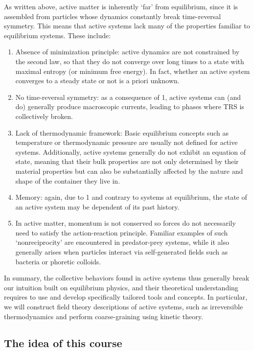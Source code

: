 As written above, active matter is inherently `far' from equilibrium, since it is assembled from particles whose dynamics constantly break time-reversal symmetry. This means that active systems lack many of the properties familiar to equilibrium systems. These include:
%
\begin{enumerate}
    \item Absence of minimization principle: active dynamics are not constrained by the second law, so that they do not converge over long times to a state with maximal entropy (or minimum free energy). In fact, whether an active system converges to a steady state or not is a priori unknown.
    \item No time-reversal symmetry: as a consequence of 1, active systems can (and do) generally produce macroscopic currents, leading to phases where TRS is collectively broken.
    \item Lack of thermodynamic framework: Basic equilibrium concepts such as temperature or thermodynamic pressure are usually not defined for active systems. Additionally, active systems generally do not exhibit an equation of state, meaning that their bulk properties are not only determined by their material properties but can also be substantially affected by the nature and shape of the container they live in.
    \item Memory: again, due to 1 and contrary to systems at equilibrium, the state of an active system may be dependent of its past history.
    \item In active matter, momentum is not conserved so forces do not necessarily need to satisfy the action-reaction principle. Familiar examples of such `nonreciprocity' are encountered in predator-prey systems, while it also generally arises when particles interact via self-generated fields such as bacteria or phoretic colloids.
\end{enumerate}
%
In summary, the collective behaviors found in active systems thus generally break our intuition built on equilibrium physics, and their theoretical understanding requires to use and develop specifically tailored tools and concepts.
In particular, we will construct field theory descriptions of active systems, such as irreversible thermodynamics and perform coarse-graining using kinetic theory.



\subsection{The idea of this course}


